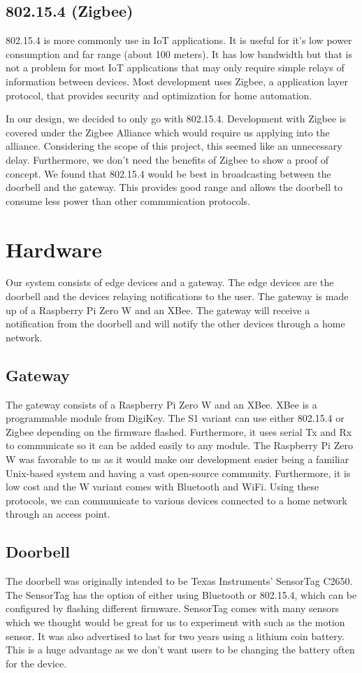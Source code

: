 \subsection{802.15.4 (Zigbee)}
802.15.4 is more commonly use in IoT applications. It is useful for it’s low power consumption and far range (about 100 meters). It has low bandwidth but that is not a problem for most IoT applications that may only require simple relays of information between devices. Most development uses Zigbee, a application layer protocol, that provides security and optimization for home automation.
 
    In our design, we decided to only go with 802.15.4. Development with Zigbee is covered under the Zigbee Alliance which would require us applying into the alliance. Considering the scope of this project, this seemed like an unnecessary delay. Furthermore, we don’t need the benefits of Zigbee to show a proof of concept. We found that 802.15.4 would be best in broadcasting between the doorbell and the gateway. This provides good range and allows the doorbell to consume less power than other communication protocols.

\section{Hardware}
Our system consists of edge devices and a gateway. The edge devices are the doorbell and the devices relaying notifications to the user. The gateway is made up of a Raspberry Pi Zero W and an XBee. The gateway will receive a notification from the doorbell and will notify the other devices through a home network.

\subsection{Gateway}
The gateway consists of a Raspberry Pi Zero W and an XBee. XBee is a programmable module from DigiKey. The S1 variant can use either 802.15.4 or Zigbee depending on the firmware flashed. Furthermore, it uses serial Tx and Rx to communicate so it can be added easily to any module. The Raspberry Pi Zero W was favorable to us as it would make our development easier being a familiar Unix-based system and having a vast open-source community. Furthermore, it is low cost and the W variant comes with Bluetooth and WiFi. Using these protocols, we can communicate to various devices connected to a home network through an access point.

\subsection{Doorbell}
The doorbell was originally intended to be Texas Instruments’ SensorTag C2650. The SensorTag has the option of either using Bluetooth or 802.15.4, which can be configured by flashing different firmware. SensorTag comes with many sensors which we thought would be great for us to experiment with such as the motion sensor. It was also advertised to last for two years using a lithium coin battery. This is a huge advantage as we don’t want users to be changing the battery often for the device.

